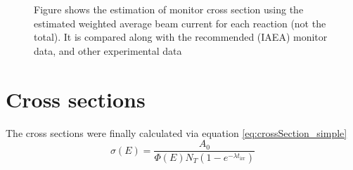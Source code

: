 \begin{figure}
    \quad
    \quad
    \quad
    \quad
    \caption{Figure shows the estimation of monitor cross section using the estimated weighted average beam current for each reaction (not the total). It is compared along with the recommended (IAEA) monitor data, and other experimental data  }%
    \label{fig:monitor_BC+CS}%
\end{figure}


\section{Cross sections}

The cross sections were finally calculated via equation \ref{eq:crossSection_simple}
\begin{equation}
    \sigma(E)=\frac{A_0}{\Phi(E)N_T(1-e^{-\lambda t_\text{irr}})}
\end{equation}

